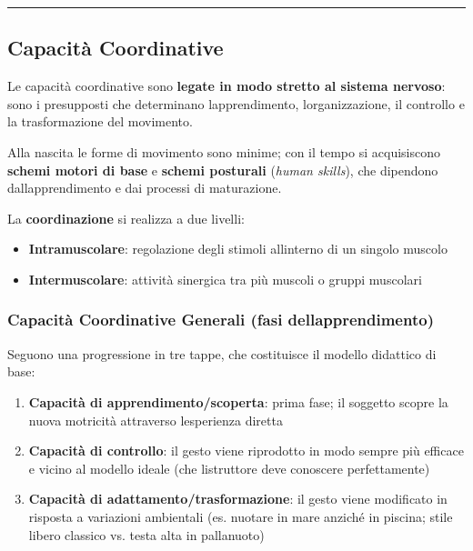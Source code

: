 \documentclass[a4paper,11pt]{article}
\providecommand{\tightlist}{%
  \setlength{\itemsep}{0pt}\setlength{\parskip}{0pt}}
\begin{document}
\begin{center}\rule{0.5\linewidth}{0.5pt}\end{center}

\subsection{Capacità Coordinative}\label{capacituxe0-coordinative}

Le capacità coordinative sono \textbf{legate in modo stretto al sistema
      nervoso}: sono i presupposti che determinano
l\textquotesingle apprendimento, l\textquotesingle organizzazione, il
controllo e la trasformazione del movimento.

Alla nascita le forme di movimento sono minime; con il tempo si
acquisiscono \textbf{schemi motori di base} e \textbf{schemi posturali}
(\emph{human skills}), che dipendono dall\textquotesingle apprendimento
e dai processi di maturazione.

La \textbf{coordinazione} si realizza a due livelli:

\begin{itemize}
      \tightlist
      \item
            \textbf{Intramuscolare}: regolazione degli stimoli
            all\textquotesingle interno di un singolo muscolo
      \item
            \textbf{Intermuscolare}: attività sinergica tra più muscoli o gruppi
            muscolari
\end{itemize}

\subsubsection{Capacità Coordinative Generali (fasi
      dell\textquotesingle apprendimento)}\label{capacituxe0-coordinative-generali-fasi-dellapprendimento}

Seguono una progressione in tre tappe, che costituisce il modello
didattico di base:

\begin{enumerate}
      \tightlist
      \item
            \textbf{Capacità di apprendimento/scoperta}: prima fase; il soggetto
            scopre la nuova motricità attraverso l\textquotesingle esperienza
            diretta
      \item
            \textbf{Capacità di controllo}: il gesto viene riprodotto in modo
            sempre più efficace e vicino al modello ideale (che
            l\textquotesingle istruttore deve conoscere perfettamente)
      \item
            \textbf{Capacità di adattamento/trasformazione}: il gesto viene
            modificato in risposta a variazioni ambientali (es. nuotare in mare
            anziché in piscina; stile libero classico vs. testa alta in
            pallanuoto)
\end{enumerate}
\end{document}
